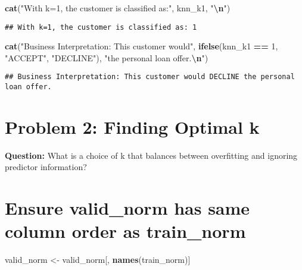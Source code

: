 \documentclass[
]{article}
\newenvironment{Shaded}{\begin{snugshade}}{\end{snugshade}}
\newcommand{\DecValTok}[1]{\textcolor[rgb]{0.00,0.00,0.81}{#1}}
\newcommand{\FunctionTok}[1]{\textcolor[rgb]{0.13,0.29,0.53}{\textbf{#1}}}
\newcommand{\NormalTok}[1]{#1}
\newcommand{\OtherTok}[1]{\textcolor[rgb]{0.56,0.35,0.01}{#1}}
\newcommand{\SpecialCharTok}[1]{\textcolor[rgb]{0.81,0.36,0.00}{\textbf{#1}}}
\newcommand{\StringTok}[1]{\textcolor[rgb]{0.31,0.60,0.02}{#1}}
\begin{document}
\begin{Shaded}
\begin{Highlighting}[]
\FunctionTok{cat}\NormalTok{(}\StringTok{"With k=1, the customer is classified as:"}\NormalTok{, knn\_k1, }\StringTok{"}\SpecialCharTok{\textbackslash{}n}\StringTok{"}\NormalTok{)}
\end{Highlighting}
\end{Shaded}

\begin{verbatim}
## With k=1, the customer is classified as: 1
\end{verbatim}

\begin{Shaded}
\begin{Highlighting}[]
\FunctionTok{cat}\NormalTok{(}\StringTok{"Business Interpretation: This customer would"}\NormalTok{, }
    \FunctionTok{ifelse}\NormalTok{(knn\_k1 }\SpecialCharTok{==} \DecValTok{1}\NormalTok{, }\StringTok{"ACCEPT"}\NormalTok{, }\StringTok{"DECLINE"}\NormalTok{), }\StringTok{"the personal loan offer.}\SpecialCharTok{\textbackslash{}n}\StringTok{"}\NormalTok{)}
\end{Highlighting}
\end{Shaded}

\begin{verbatim}
## Business Interpretation: This customer would DECLINE the personal loan offer.
\end{verbatim}

\section{Problem 2: Finding Optimal
k}\label{problem-2-finding-optimal-k}

\textbf{Question:} What is a choice of k that balances between
overfitting and ignoring predictor information?

\section{Ensure valid\_norm has same column order as
train\_norm}\label{ensure-valid_norm-has-same-column-order-as-train_norm}

\begin{Shaded}
\begin{Highlighting}[]
\NormalTok{valid\_norm }\OtherTok{\textless{}{-}}\NormalTok{ valid\_norm[, }\FunctionTok{names}\NormalTok{(train\_norm)]}
\end{Highlighting}
\end{Shaded}
\end{document}
